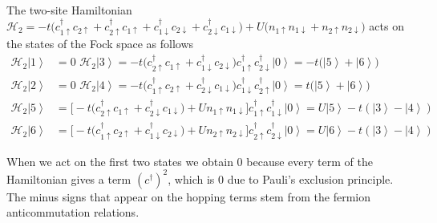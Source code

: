 The two-site Hamiltonian 
$
\mathcal{H}_{2} = - t \big( c_{1\uparrow}^\dagger c_{2\uparrow} +  c_{2\uparrow}^\dagger c_{1\uparrow} + c_{1\downarrow}^\dagger c_{2\downarrow} +  c_{2\downarrow}^\dagger c_{1\downarrow} \big) + U \big(n_{1\uparrow}n_{1\downarrow} + n_{2\uparrow}n_{2\downarrow} \big)
$ 
acts on the states of the Fock space as follows
\begin{equation}
\begin{split}
\mathcal{H}_{2}\left| 1 \right\rangle & = 0 \,\,
\mathcal{H}_{2}\left| 3 \right\rangle  =-t \big(c_{2\uparrow}^\dagger c_{1\uparrow} + c_{1\downarrow}^\dagger c_{2\downarrow} \big)c_{1\uparrow}^\dagger  c_{2\downarrow}^\dagger \left| 0 \right\rangle = -t \big( \left| 5 \right\rangle + \left| 6 \right\rangle \big)  \\
\mathcal{H}_{2}\left| 2 \right\rangle  &= 0 \,\,
\mathcal{H}_{2}\left| 4 \right\rangle =-t \big(c_{1\uparrow}^\dagger c_{2\uparrow} + c_{2\downarrow}^\dagger c_{1\downarrow} \big)c_{1\downarrow}^\dagger c_{2\uparrow}^\dagger \left| 0 \right\rangle = t \big( \left| 5 \right\rangle + \left| 6 \right\rangle \big) \\
\mathcal{H}_{2}\left| 5 \right\rangle & =\bigg[ -t \big(c_{2\uparrow}^\dagger c_{1\uparrow} + c_{2\downarrow}^\dagger c_{1\downarrow} \big) + U n_{1\uparrow}n_{1\downarrow}  \bigg]c_{1\uparrow}^\dagger c_{1\downarrow}^\dagger \left| 0 \right\rangle = U \left| 5 \right\rangle - t ( \left| 3 \right\rangle - \left| 4 \right\rangle )  \\
\mathcal{H}_{2}\left| 6 \right\rangle & = \bigg[ -t \big(c_{1\uparrow}^\dagger c_{2\uparrow} + c_{1\downarrow}^\dagger c_{2\downarrow} \big) + U n_{2\uparrow}n_{2\downarrow}  \bigg]c_{2\uparrow}^\dagger c_{2\downarrow}^\dagger \left| 0 \right\rangle = U \left| 6 \right\rangle - t ( \left| 3 \right\rangle - \left| 4 \right\rangle ) 
\end{split}
\end{equation}

When we act on the first two states we obtain $0$ because every term of the Hamiltonian gives a term $(c^\dagger)^2$, which is $0$ due to Pauli's exclusion principle.
The minus signs that appear on the hopping terms stem from the fermion anticommutation relations.

